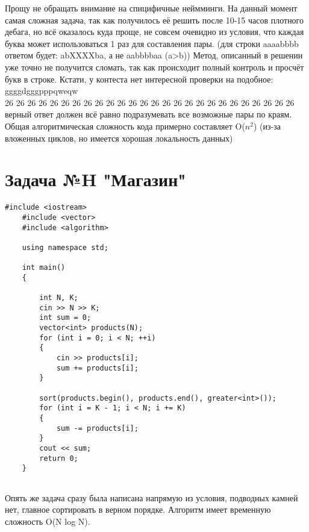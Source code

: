 \documentclass{article}
\begin{document}
Прощу не обращать внимание на спицифичные неймминги. На данный момент самая сложная задача, так как получилось её решить после 10-15 часов плотного дебага, но всё оказалось куда проще, не совсем очевидно из условия, что каждая буква может использоваться 1 раз для составления пары. (для строки aaaabbbb ответом будет: abXXXXba, а не aabbbbaa (a>b))
Метод, описанный в решении уже точно не получится сломать, так как происходит полный контроль и просчёт букв в строке. Кстати, у контеста нет интересной проверки на подобное:
\\
ggggdgggpppqweqw\\
26 26 26 26 26 26 26 26 26 26 26 26 26 26 26 26 26 26 26 26 26 26 26 26 26 26\\
верный ответ должен всё равно подразумевать все возможные пары по краям.\\
Общая алгоритмическая сложность кода примерно составляет O($n^2$) (из-за вложенных циклов, но имеется хорошая локальность данных)


\section{Задача №H "Магазин"}
\begin{lstlisting}[frame=single, basicstyle=\ttfamily, breaklines=true, breakatwhitespace=true, postbreak=\mbox{\textcolor{red}{$\hookrightarrow$}\space}]
    #include <iostream>
    #include <vector>
    #include <algorithm>
    
    using namespace std;
    
    int main()
    {
    
        int N, K;
        cin >> N >> K;
        int sum = 0;
        vector<int> products(N);
        for (int i = 0; i < N; ++i)
        {
            cin >> products[i];
            sum += products[i];
        }
    
        sort(products.begin(), products.end(), greater<int>());
        for (int i = K - 1; i < N; i += K)
        {
            sum -= products[i];
        }
        cout << sum;
        return 0;
    }
    
\end{lstlisting}
Опять же задача сразу была написана напрямую из условия, подводных камней нет, главное сортировать в верном порядке.
Алгоритм имеет временную сложность O(N log N).
\end{document}
